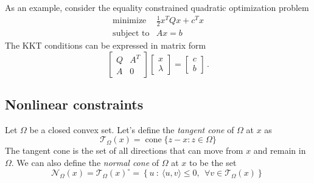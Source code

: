 As an example, consider the equality constrained quadratic optimization problem
\begin{equation*} 
  \begin{array}{ll} 
  \text{minimize} &\frac{1}{2} x^TQx + c^T x\\
  \text{subject to} &Ax = b 
  \end{array}
\end{equation*}
The KKT conditions can be expressed in matrix form
 $$\left[\begin{array}{cc} 
  Q &A^T\\
  A & 0 \end{array} \right]
    \left[\begin{array}{c} 
x\\
\lambda\end{array} \right] =  
\left[\begin{array}{c} 
c\\
b\end{array} \right] \,.$$


\subsection{Nonlinear constraints}

Let $\Omega$ be a closed convex set.  Let's define the \emph{tangent cone} of $\Omega$ at $x$ as 
\[
\mathcal{T}_{\Omega}(x) = \operatorname{cone} \{z - x : z \in \Omega\}
\]
The tangent cone is the set of all directions that can move from $x$ and remain in $\Omega$.  We can also define the \emph{normal cone} of $\Omega$ at $x$ to be the set
\[
	\mathcal{N}_{\Omega}(x) = \mathcal{T}_{\Omega}(x)^\circ = \left\{ u~:~ \langle u,v \rangle \leq 0,~~\forall v\in \mathcal{T}_{\Omega}(x) \right\} \,
\]



